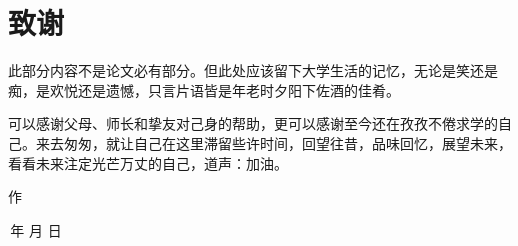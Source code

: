 \section*{\centering 致\qquad 谢}
\bigskip
    此部分内容不是论文必有部分。但此处应该留下大学生活的记忆，无论是笑还是痴，是欢悦还是遗憾，只言片语皆是年老时夕阳下佐酒的佳肴。

    可以感谢父母、师长和挚友对己身的帮助，更可以感谢至今还在孜孜不倦求学的自己。来去匆匆，就让自己在这里滞留些许时间，回望往昔，品味回忆，展望未来，看看未来注定光芒万丈的自己，道声：加油。\bigskip

    \mbox{}\hfill\ifanonymous 作\else \authorname\fi\qquad\quad\mbox{}\bigskip

    \mbox{}\hfill\number\year\,年\,\number\month\,月\,\number\day\,日\quad


